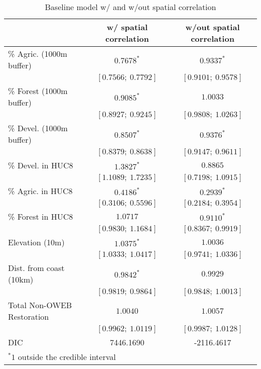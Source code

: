 
\begin{table}
\caption{Baseline model w/ and w/out spatial correlation}
\begin{center}
\begin{tabular}{l c c }
\hline
                           & w/ spatial correlation & w/out spatial correlation \\
\hline
\%  Agric. (1000m buffer) & $0.7678^{*}$        & $0.9337^{*}$        \\
                           & $[0.7566;\ 0.7792]$ & $[0.9101;\ 0.9578]$ \\
\%  Forest (1000m buffer) & $0.9085^{*}$        & $1.0033$            \\
                           & $[0.8927;\ 0.9245]$ & $[0.9808;\ 1.0263]$ \\
\%  Devel. (1000m buffer) & $0.8507^{*}$        & $0.9376^{*}$        \\
                           & $[0.8379;\ 0.8638]$ & $[0.9147;\ 0.9611]$ \\
\%  Devel. in HUC8        & $1.3827^{*}$        & $0.8865$            \\
                           & $[1.1089;\ 1.7235]$ & $[0.7198;\ 1.0915]$ \\
\%  Agric. in HUC8        & $0.4186^{*}$        & $0.2939^{*}$        \\
                           & $[0.3106;\ 0.5596]$ & $[0.2184;\ 0.3954]$ \\
\%  Forest in HUC8        & $1.0717$            & $0.9110^{*}$        \\
                           & $[0.9830;\ 1.1684]$ & $[0.8367;\ 0.9919]$ \\
Elevation (10m)            & $1.0375^{*}$        & $1.0036$            \\
                           & $[1.0333;\ 1.0417]$ & $[0.9741;\ 1.0336]$ \\
Dist. from coast (10km)    & $0.9842^{*}$        & $0.9929$            \\
                           & $[0.9819;\ 0.9864]$ & $[0.9848;\ 1.0013]$ \\
Total Non-OWEB Restoration & $1.0040$            & $1.0057$            \\
                           & $[0.9962;\ 1.0119]$ & $[0.9987;\ 1.0128]$ \\
\hline
DIC                        & 7446.1690           & -2116.4617          \\
\hline
\multicolumn{3}{l}{\scriptsize{$^* 1$ outside the credible interval}}
\end{tabular}
\label{table:basemods}
\end{center}
\end{table}

